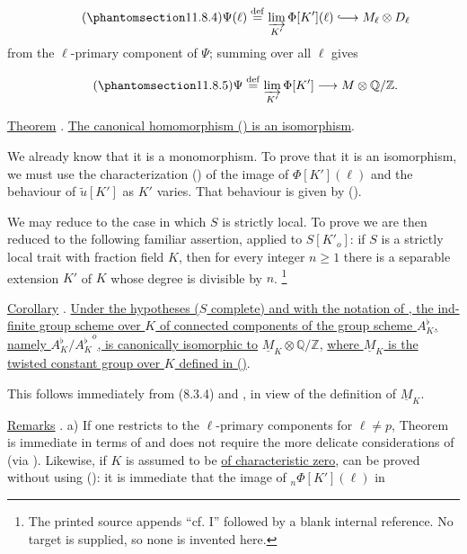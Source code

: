 \begin{equation}\tag{\SGARefTarget{sga7.sga7i.eix.n11-8-4}{11.8.4}}
\Psi(\ell)\mathrel{\mathop{=}^{\mathrm{def}}}
 \varinjlim_{K'}\Phi[K'](\ell)
 \lhook\joinrel\longrightarrow M_\ell\otimes D_\ell
\end{equation}
from the $\ell$-primary component of $\Psi$; summing over all $\ell$ gives

\begin{equation}\tag{\SGARefTarget{sga7.sga7i.eix.n11-8-5}{11.8.5}}
\Psi\mathrel{\mathop{=}^{\mathrm{def}}}
 \varinjlim_{K'}\Phi[K']
 \longrightarrow M\otimes\mathbb Q/\mathbb Z.
\end{equation}

\medskip
\noindent
\underline{Theorem} . \underline{The canonical homomorphism ()
is an isomorphism}.

We already know that it is a monomorphism. To prove that it is an
isomorphism, we must use the characterization () of the image of
$\Phi[K'](\ell)$ and the behaviour of $\widetilde u[K']$ as $K'$ varies.
That behaviour is given by ().

We may reduce to the case in which $S$ is strictly local. To prove  we
are then reduced to the following familiar assertion, applied to $S[K'_o]$:
if $S$ is a strictly local trait with fraction field $K$, then for every
integer $n\geq1$ there is a separable extension $K'$ of $K$ whose degree is
divisible by $n$.
\footnote{The printed source appends ``cf. I'' followed by a blank internal
reference. No target is supplied, so none is invented here.}

\medskip
\noindent
\underline{Corollary} . \underline{Under the hypotheses ($S$
complete) and with the notation of , the ind-finite group scheme over
$K$ of connected components of the group scheme $A_K^{\flat}$,
namely $A_K^{\flat}/{A_K^{\flat}}^o$, is canonically isomorphic to}
$\underline M_K\otimes\mathbb Q/\mathbb Z$, \underline{where
$\underline M_K$ is the twisted constant group over $K$ defined in
()}.

This follows immediately from (8.3.4) and , in view of the definition
of $\underline M_K$.

\medskip
\noindent
\underline{Remarks} . a) If one restricts to the $\ell$-primary
components for $\ell\neq p$, Theorem  is immediate in terms of  and
does not require the more delicate considerations of  (via ).
Likewise, if $K$ is assumed to be \underline{of characteristic zero}, 
can be proved without using (): it is immediate that the image of
${}_n\Phi[K'](\ell)$ in

